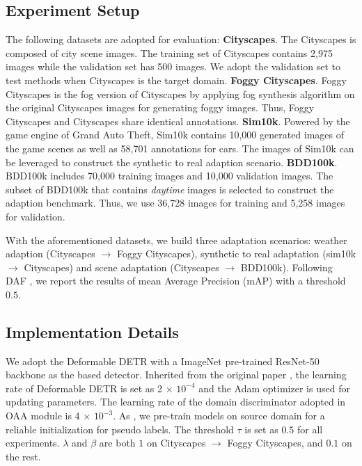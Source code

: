 \documentclass[sigconf]{acmart}
\begin{document}
\subsection{Experiment Setup}
The following datasets are adopted for evaluation:
\textbf{Cityscapes}. The Cityscapes \cite{cityscapes} is composed of city scene images. The training set of Cityscapes contains 2,975 images while the validation set has 500 images. We adopt the validation set to test methods when Cityscapes is the target domain.
\textbf{Foggy Cityscapes}. Foggy Cityscapes \cite{foggy} is the fog version of Cityscapes by applying fog synthesis algorithm on the original Cityscapes images for generating foggy images. Thus, Foggy Cityscapes and Cityscapes share identical annotations. 
\textbf{Sim10k}. Powered by the game engine of Grand Auto Theft, Sim10k \cite{sim10k} contains 10,000 generated images of the game scenes as well as 58,701 annotations for cars. The images of Sim10k can be leveraged to construct the synthetic to real adaption scenario.
\textbf{BDD100k}. BDD100k \cite{yu2018bdd100k} includes 70,000 training images and 10,000 validation images. The subset of BDD100k that contains \textit{daytime} images is selected to construct the adaption benchmark. Thus, we use 36,728 images for training and 5,258 images for validation.

With the aforementioned datasets, we build three adaptation scenarios: weather adaption (Cityscapes $\rightarrow$ Foggy Cityscapes), synthetic to real adaptation (sim10k $\rightarrow$ Cityscapes) and scene adaptation (Cityscapes $\rightarrow$ BDD100k). Following DAF \cite{faster-rcnn}, we report the results of mean Average Precision (mAP) with a threshold $0.5$.


\subsection{Implementation Details}
We adopt the Deformable DETR \cite{zhu2020deformable} with a ImageNet \cite{deng2009imagenet} pre-trained ResNet-50 \cite{resnet} backbone as the based detector. Inherited from the original paper \cite{zhu2020deformable}, the learning rate of Deformable DETR is set as 2 $\times$ $10^{-4}$ and the Adam optimizer \cite{kingma2014adam} is used for updating parameters. The learning rate of the domain discriminator adopted in OAA module is 4 $\times$ $10^{-3}$. As \cite[]{jiang2021decoupled}, we pre-train models on source domain for a reliable initialization for pseudo labels. The threshold $\tau$ is set as $0.5$ for all experiments. $\lambda$ and $\beta$ are both $1$ on Cityscapes $\rightarrow$ Foggy Cityscapes, and $0.1$ on the rest. 
\end{document}
